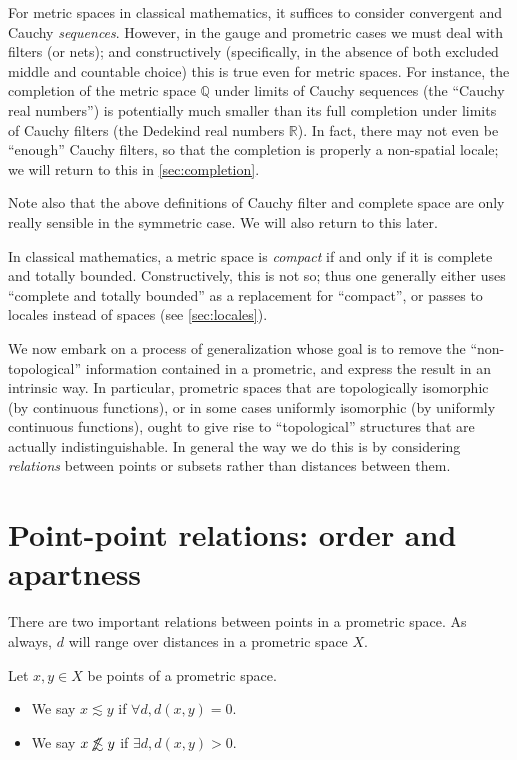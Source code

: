 \documentclass{article}
\def\R{\mathbb{R}}
\def\oapt{\mathrel{\!\not\,\not\lesssim}}
\def\leapx{\lesssim}
\begin{document}
For metric spaces in classical mathematics, it suffices to consider convergent and Cauchy \emph{sequences}.
However, in the gauge and prometric cases we must deal with filters (or nets); and constructively (specifically, in the absence of both excluded middle and countable choice) this is true even for metric spaces.
For instance, the completion of the metric space $\mathbb{Q}$ under limits of Cauchy sequences (the ``Cauchy real numbers'') is potentially much smaller than its full completion under limits of Cauchy filters (the Dedekind real numbers $\R$).
In fact, there may not even be ``enough'' Cauchy filters, so that the completion is properly a non-spatial locale; we will return to this in \cref{sec:completion}.

Note also that the above definitions of Cauchy filter and complete space are only really sensible in the symmetric case.
We will also return to this later.

In classical mathematics, a metric space is \emph{compact} if and only if it is complete and totally bounded.
Constructively, this is not so; thus one generally either uses ``complete and totally bounded'' as a replacement for ``compact'', or passes to locales instead of spaces (see \cref{sec:locales}).


We now embark on a process of generalization whose goal is to remove the ``non-topological'' information contained in a prometric, and express the result in an intrinsic way.
In particular, prometric spaces that are topologically isomorphic (by continuous functions), or in some cases uniformly isomorphic (by uniformly continuous functions), ought to give rise to ``topological'' structures that are actually indistinguishable.
In general the way we do this is by considering \emph{relations} between points or subsets rather than distances between them.


\section{Point-point relations: order and apartness}
\label{sec:point-point}
\label{sec:order}

There are two important relations between points in a prometric space.
As always, $d$ will range over distances in a prometric space $X$.

\begin{defn}\label{def:promet-ord}
  Let $x,y\in X$ be points of a prometric space.
  \begin{itemize}
  \item We say $x\leapx y$ if $\forall d, d(x,y)=0$.
  \item We say $x\oapt y$ if $\exists d, d(x,y)>0$.
  \end{itemize}
\end{defn}
\end{document}
